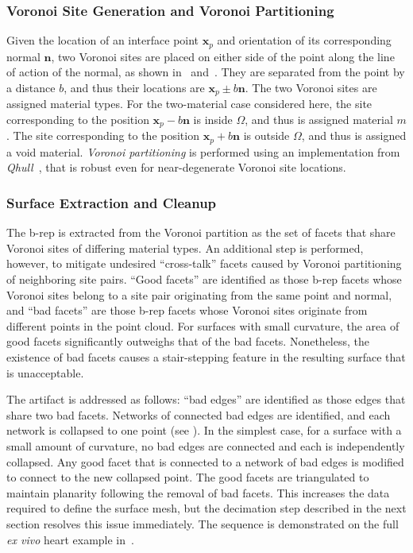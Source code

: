 \subsubsection{Voronoi Site Generation and Voronoi Partitioning}

Given the location of an interface point $\bm{x}_p$ and orientation of its corresponding normal $\bm{n}$, two Voronoi sites are placed on either side of the point along the line of action of the normal, as shown in~ and~. They are separated from the point by a distance $b$, and thus their locations are $\bm{x}_p \pm b \bm{n}$. The two Voronoi sites are assigned material types. For the two-material case considered here, the site corresponding to the position $\bm{x}_p - b\bm{n}$ is inside $\Omega$, and thus is assigned material $m$. The site corresponding to the position $\bm{x}_p + b\bm{n}$ is outside $\Omega$, and thus is assigned a void material. \textit{Voronoi partitioning} is performed using an implementation from \textit{Qhull}~\cite{barber_1996}, that is robust even for near-degenerate Voronoi site locations.

\subsubsection{Surface Extraction and Cleanup}

The b-rep is extracted from the Voronoi partition as the set of facets that share Voronoi sites of differing material types. An additional step is performed, however, to mitigate undesired ``cross-talk'' facets caused by Voronoi partitioning of neighboring site pairs. ``Good facets'' are identified as those b-rep facets whose Voronoi sites belong to a site pair originating from the same point and normal, and ``bad facets'' are those b-rep facets whose Voronoi sites originate from different points in the point cloud. For surfaces with small curvature, the area of good facets significantly outweighs that of the bad facets. Nonetheless, the existence of bad facets causes a stair-stepping feature in the resulting surface that is unacceptable.

The artifact is addressed as follows: ``bad edges'' are identified as those edges that share two bad facets. Networks of connected bad edges are identified, and each network is collapsed to one point (see ). In the simplest case, for a surface with a small amount of curvature, no bad edges are connected and each is independently collapsed. Any good facet that is connected to a network of bad edges is modified to connect to the new collapsed point. The good facets are triangulated to maintain planarity following the removal of bad facets. This increases the data required to define the surface mesh, but the decimation step described in the next section resolves this issue immediately. The sequence is demonstrated on the full \textit{ex vivo} heart example in~.

